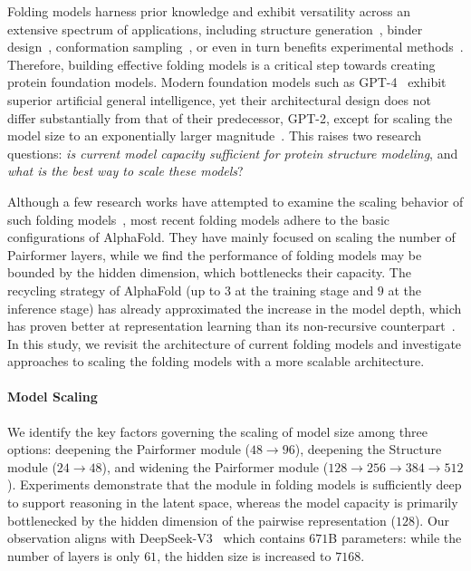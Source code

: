 \documentclass[]{bytedance_seed}
\begin{document}
Folding models harness prior knowledge and exhibit versatility across an extensive spectrum of applications, including structure generation~\cite{watson2023novo,krishna2024generalized}, binder design~\cite{pacesa2024bindcraft}, conformation sampling~\cite{monteiro2024high}, or even in turn benefits experimental methods~\cite{raghu2025multiscaleguidanceproteinstructure,jamali2024automated}. Therefore, building effective folding models is a critical step towards creating protein foundation models. Modern foundation models such as GPT-4~\cite{abramson2024accurate} exhibit superior artificial general intelligence, yet their architectural design does not differ substantially from that of their predecessor, GPT-2, except for scaling the model size to an exponentially larger magnitude~\cite{radford2019language}. This raises two research questions: \textit{is current model capacity sufficient for protein structure modeling}, and \textit{what is the best way to scale these models}?

Although a few research works have attempted to examine the scaling behavior of such folding models~\cite{qiao2024neuralplexer3,passaro2025boltz}, most recent folding models adhere to the basic configurations of AlphaFold. They have mainly focused on scaling the number of Pairformer layers, while we find the performance of folding models may be bounded by the hidden dimension, which bottlenecks their capacity. The recycling strategy of AlphaFold (up to $3$ at the training stage and $9$ at the inference stage) has already approximated the increase in the model depth, which has proven better at representation learning than its non-recursive counterpart~\cite{lan2019albert,yang2023looped}. In this study, we revisit the architecture of current folding models and investigate approaches to scaling the folding models with a more scalable architecture. 

\paragraph{Model Scaling} We identify the key factors governing the scaling of model size among three options: deepening the Pairformer module ($48 \to 96$), deepening the Structure module ($24 \to 48$), and widening the Pairformer module ($128 \to 256 \to 384 \to 512$). Experiments demonstrate that the module in folding models is sufficiently deep to support reasoning in the latent space, whereas the model capacity is primarily bottlenecked by the hidden dimension of the pairwise representation ($128$). Our observation aligns with DeepSeek-V3~\cite{liu2024deepseek} which contains $671$B parameters: while the number of layers is only $61$, the hidden size is increased to $7168$.
\end{document}
